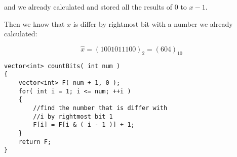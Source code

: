 and we already calculated and stored all the results of 0 to $x - 1$.

Then we know that $x$ is differ by rightmost bit with a number we already calculated:

\[
\hat{x} = (1001011100)_2 = (604)_{10}
\]

\setcounter{lstlisting}{0}
\begin{lstlisting}[style=customc, caption={DP}]
vector<int> countBits( int num )
{
    vector<int> F( num + 1, 0 );
    for( int i = 1; i <= num; ++i )
    {
        //find the number that is differ with
        //i by rightmost bit 1
        F[i] = F[i & ( i - 1 )] + 1;
    }
    return F;
}
\end{lstlisting}

